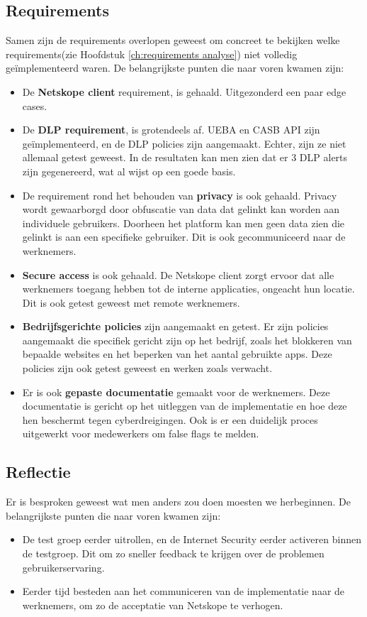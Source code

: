 \subsection{Requirements}
Samen zijn de requirements overlopen geweest om concreet te bekijken welke requirements(zie Hoofdstuk \ref{ch:requirements analyse}) niet volledig geïmplementeerd waren. De belangrijkste punten die naar voren kwamen zijn:
\begin{itemize}
    \item De \textbf{Netskope client} requirement, is gehaald. Uitgezonderd een paar edge cases.
    \item De \textbf{DLP requirement}, is grotendeels af. UEBA en CASB API zijn geïmplementeerd, en de DLP policies zijn aangemaakt. Echter, zijn ze niet allemaal getest geweest. In de resultaten kan men zien dat er 3 DLP alerts zijn gegenereerd, wat al wijst op een goede basis.
    \item De requirement rond het behouden van \textbf{privacy} is ook gehaald. Privacy wordt gewaarborgd door obfuscatie van data dat gelinkt kan worden aan individuele gebruikers. Doorheen het platform kan men geen data zien die gelinkt is aan een specifieke gebruiker. Dit is ook gecommuniceerd naar de werknemers.
    \item \textbf{Secure access} is ook gehaald. De Netskope client zorgt ervoor dat alle werknemers toegang hebben tot de interne applicaties, ongeacht hun locatie. Dit is ook getest geweest met remote werknemers.
    \item \textbf{Bedrijfsgerichte policies} zijn aangemaakt en getest. Er zijn policies aangemaakt die specifiek gericht zijn op het bedrijf, zoals het blokkeren van bepaalde websites en het beperken van het aantal gebruikte apps. Deze policies zijn ook getest geweest en werken zoals verwacht.
    \item Er is ook \textbf{gepaste documentatie} gemaakt voor de werknemers. Deze documentatie is gericht op het uitleggen van de implementatie en hoe deze hen beschermt tegen cyberdreigingen. Ook is er een duidelijk proces uitgewerkt voor medewerkers om false flags te melden.
\end{itemize}

\subsection{Reflectie}
Er is besproken geweest wat men anders zou doen moesten we herbeginnen.
De belangrijkste punten die naar voren kwamen zijn:
\begin{itemize}
    \item De test groep eerder uitrollen, en de Internet Security eerder activeren binnen de testgroep. Dit om zo sneller feedback te krijgen over de problemen gebruikerservaring.
    \item Eerder tijd besteden aan het communiceren van de implementatie naar de werknemers, om zo de acceptatie van Netskope te verhogen. 
\end{itemize}

